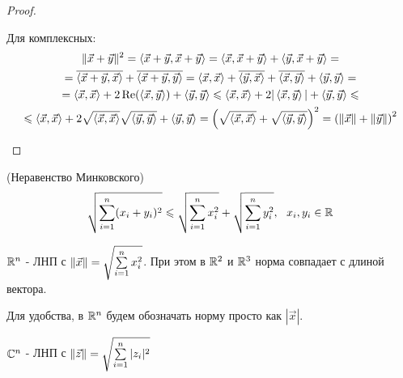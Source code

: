 \begin{proof}
\begin{enumerate}
			Для комплексных:
			\begin{multline*}
				\|\vec{x} + \vec{y}\|^2 = \left\langle\vec{x} +
				\vec{y}, \vec{x} + \vec{y}\right\rangle =
				\left\langle\vec{x}, \vec{x} + \vec{y}\right\rangle + \left\langle\vec{y},
				\vec{x} + \vec{y}\right\rangle =
				\\
				= \overline{\left\langle\vec{x} + \vec{y},
				\vec{x}\right\rangle} + \overline{\left\langle\vec{x} + \vec{y}, \vec{y}\right\rangle}
				= \left\langle\vec{x}, \vec{x}\right\rangle + \overline{\left\langle\vec{y}, \vec{x}\right\rangle}
				+ \overline{\left\langle\vec{x}, \vec{y}\right\rangle} + \left\langle\vec{y}, \vec{y}\right\rangle =
				\\
				= \left\langle\vec{x}, \vec{x}\right\rangle + 2\operatorname{Re}(\left\langle\vec{x}, \vec{y}\right\rangle) +
				\left\langle\vec{y}, \vec{y}\right\rangle
				\leqslant \left\langle\vec{x}, \vec{x}\right\rangle + 2 |\left\langle\vec{x}, \vec{y}\right\rangle| +
				\left\langle\vec{y}, \vec{y}\right\rangle \leqslant
				\\
				\leqslant \left\langle\vec{x}, \vec{x}\right\rangle + 2
				\sqrt{\left\langle\vec{x}, \vec{x}\right\rangle} \sqrt{\left\langle\vec{y}, \vec{y}\right\rangle}
				+ \left\langle\vec{y}, \vec{y}\right\rangle =
				\left(\sqrt{\left\langle\vec{x}, \vec{x}\right\rangle}
				+ \sqrt{\left\langle\vec{y}, \vec{y}\right\rangle}\right)^2
				= \left(\|\vec{x}\| + \|\vec{y}\|\right)^2
			\end{multline*}
	\end{enumerate}
\end{proof}

\begin{corollary} (Неравенство Минковского)
	\[
		\sqrt{\sum\limits_{i = 1}^n (x_i + y_i)^2} \leqslant \sqrt{\sum\limits_{i = 1}^n x_i^2} + \sqrt{\sum\limits_{i = 1}^n y_i^2},\ \ x_i, y_i \in \mathbb{R} 
	\]
\end{corollary}

\begin{lemma}
	$\mathbb{R}^n$ - ЛНП с $\|\vec{x}\| = \sqrt{\sum\limits_{i = 1}^n x_i^2}$. При этом в $\mathbb{R}^2$ и $\mathbb{R}^3$ норма совпадает с длиной вектора.
\end{lemma}

\begin{note}
	Для удобства, в $\mathbb{R}^n$ будем обозначать норму просто как $|\vec{x}|$.
\end{note}

\begin{lemma}
	$\mathbb{C}^n$ - ЛНП с $\|\vec{z}\| = \sqrt{\sum\limits_{i = 1}^n |z_i|^2}$
\end{lemma}